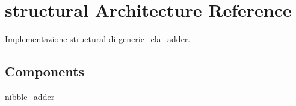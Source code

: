 \hypertarget{classgeneric__cla__adder_1_1structural}{\section{structural Architecture Reference}
\label{classgeneric__cla__adder_1_1structural}
}


Implementazione structural di \hyperlink{classgeneric__cla__adder}{generic\+\_\+cla\+\_\+adder}.  


\subsection*{Components}
 \begin{DoxyCompactItemize}
\item 
\hyperlink{group___carry_loockahead_ga98a3a5b152caf0f2de1e31ac60088369}{nibble\+\_\+adder}  {\bfseries }  
\end{DoxyCompactItemize}
